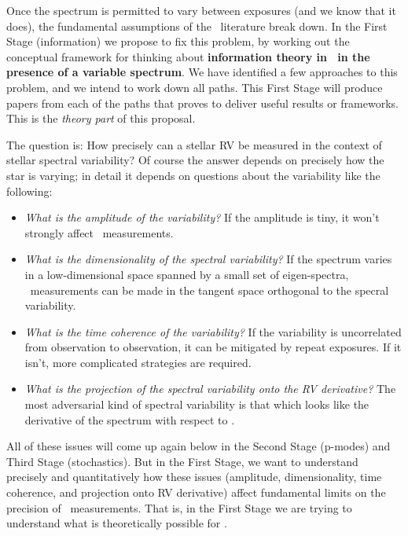 \documentclass[12pt, letterpaper]{article}
\begin{document}
Once the spectrum is permitted to vary between exposures (and we know that
it does), the fundamental assumptions of the \EPRV\ literature break down.
In the First Stage (information) we propose to fix this problem, by
working out the conceptual framework for thinking about
\textbf{information theory in \EPRV\ in the presence of a variable
  spectrum}.
We have identified a few approaches to this problem, and we intend to
work down all paths.
This First Stage will produce papers from each of the paths that proves
to deliver useful results or frameworks.
This is the \emph{theory part} of this proposal.

The question is: How precisely can a stellar RV be measured in the context
of stellar spectral variability?
Of course the answer depends on precisely how the star is varying;
in detail it depends on questions about the variability like the following:
\begin{itemize}
\item
\emph{What is the amplitude of the variability?}
If the amplitude is tiny, it won't strongly affect \RV\ measurements.
\item
\emph{What is the dimensionality of the spectral variability?}
If the spectrum varies in a low-dimensional space spanned by a small set
of eigen-spectra, \EPRV\ measurements can be made in the tangent space
orthogonal to the specral variability.
\item
\emph{What is the time coherence of the variability?}
If the variability is uncorrelated from observation to observation, it
can be mitigated by repeat exposures. If it isn't, more complicated
strategies are required.
\item
\emph{What is the projection of the spectral variability onto the RV derivative?}
The most adversarial kind of spectral variability is that which looks
like the derivative of the spectrum with respect to \RV.
\end{itemize}

\noindent
All of these issues will come up again below in the Second Stage (p-modes)
and Third Stage (stochastics).
But in the First Stage, we want to understand precisely and quantitatively
how these issues (amplitude, dimensionality, time coherence, and projection
onto RV derivative) affect fundamental limits on the precision of
\EPRV\ measurements.
That is, in the First Stage we are trying to understand what is theoretically
possible for \EPRV.
\end{document}
